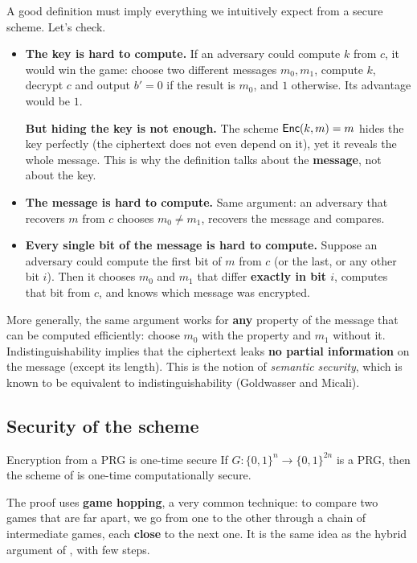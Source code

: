 A good definition must imply everything we intuitively expect from a secure scheme. Let's check.

\begin{itemize}
  \item \textbf{The key is hard to compute.} If an adversary could compute $k$ from $c$, it would win the game: choose two different messages $m_0, m_1$, compute $k$, decrypt $c$ and output $b' = 0$ if the result is $m_0$, and $1$ otherwise. Its advantage would be $1$.

  \textbf{But hiding the key is not enough.} The scheme $\mathsf{Enc}(k, m) = m$ hides the key perfectly (the ciphertext does not even depend on it), yet it reveals the whole message. This is why the definition talks about the \textbf{message}, not about the key.

  \item \textbf{The message is hard to compute.} Same argument: an adversary that recovers $m$ from $c$ chooses $m_0 \neq m_1$, recovers the message and compares.

  \item \textbf{Every single bit of the message is hard to compute.} Suppose an adversary could compute the first bit of $m$ from $c$ (or the last, or any other bit $i$). Then it chooses $m_0$ and $m_1$ that differ \textbf{exactly in bit $i$}, computes that bit from $c$, and knows which message was encrypted.
\end{itemize}

More generally, the same argument works for \textbf{any} property of the message that can be computed efficiently: choose $m_0$ with the property and $m_1$ without it. Indistinguishability implies that the ciphertext leaks \textbf{no partial information} on the message (except its length). This is the notion of \textit{semantic security}, which is known to be equivalent to indistinguishability (Goldwasser and Micali).

\subsection{Security of the scheme}

\begin{framedthm}[label={thm:prg-otp}]{Encryption from a PRG is one-time secure}
  If $G : \{0,1\}^n \to \{0,1\}^{2n}$ is a PRG, then the scheme of  is one-time computationally secure.
\end{framedthm}

The proof uses \textbf{game hopping}, a very common technique: to compare two games that are far apart, we go from one to the other through a chain of intermediate games, each \textbf{close} to the next one. It is the same idea as the hybrid argument of , with few steps.

